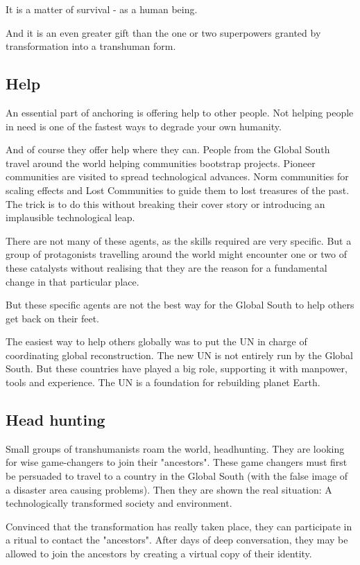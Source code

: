 It is a matter of survival - as a human being.

And it is an even greater gift than the one or two superpowers granted by transformation into a transhuman form.

\subsection{Help}

An essential part of anchoring is offering help to other people. Not helping people in need is one of the fastest ways to degrade your own humanity.

And of course they offer help where they can. People from the Global South travel around the world helping communities bootstrap projects. Pioneer communities are visited to spread technological advances. Norm communities for scaling effects and Lost Communities to guide them to lost treasures of the past. The trick is to do this without breaking their cover story or introducing an implausible technological leap.

There are not many of these agents, as the skills required are very specific. But a group of protagonists travelling around the world might encounter one or two of these catalysts without realising that they are the reason for a fundamental change in that particular place.

But these specific agents are not the best way for the Global South to help others get back on their feet.

The easiest way to help others globally was to put the UN in charge of coordinating global reconstruction. The new UN is not entirely run by the Global South. But these countries have played a big role, supporting it with manpower, tools and experience. The UN is a foundation for rebuilding planet Earth.

\subsection{Head hunting}

Small groups of transhumanists roam the world, headhunting. They are looking for wise game-changers to join their "ancestors". These game changers must first be persuaded to travel to a country in the Global South (with the false image of a disaster area causing problems).
Then they are shown the real situation: A technologically transformed society and environment.

Convinced that the transformation has really taken place, they can participate in a ritual to contact the "ancestors". After days of deep conversation, they may be allowed to join the ancestors by creating a virtual copy of their identity.

